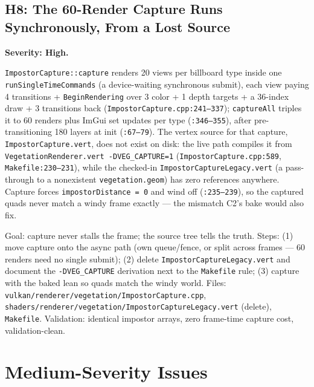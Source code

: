 \documentclass[11pt,a4paper]{article}
\begin{document}
\subsection{H8: The 60-Render Capture Runs Synchronously, From a Lost Source}

\textbf{Severity: High.}

\texttt{ImpostorCapture::capture} renders 20 views per billboard type
inside one \texttt{runSingleTimeCommands} (a device-waiting synchronous
submit), each view paying 4 transitions + \texttt{BeginRendering} over
3 color + 1 depth targets + a 36-index draw + 3 transitions back
(\texttt{ImpostorCapture.cpp:241--337}); \texttt{captureAll} triples it to
60 renders plus ImGui set updates per type (\texttt{:346--355}), after
pre-transitioning 180 layers at init (\texttt{:67--79}). The vertex source
for that capture, \texttt{ImpostorCapture.vert}, does not exist on disk:
the live path compiles it from \texttt{VegetationRenderer.vert
-DVEG\_CAPTURE=1} (\texttt{ImpostorCapture.cpp:589},
\texttt{Makefile:230--231}), while the checked-in
\texttt{ImpostorCaptureLegacy.vert} (a pass-through to a nonexistent
\texttt{vegetation.geom}) has zero references anywhere. Capture forces
\texttt{impostorDistance = 0} and wind off (\texttt{:235--239}), so the
captured quads never match a windy frame exactly --- the mismatch C2's bake
would also fix.

\begin{tcolorbox}[promptbox={Prompt --- H8: async capture, delete the orphan}]
Goal: capture never stalls the frame; the source tree tells the truth.
Steps: (1) move capture onto the async path (own queue/fence, or split
across frames --- 60 renders need no single submit); (2) delete
\texttt{ImpostorCaptureLegacy.vert} and document the \texttt{-DVEG\_CAPTURE}
derivation next to the \texttt{Makefile} rule; (3) capture with the baked
lean so quads match the windy world. Files:
\texttt{vulkan/renderer/vegetation/ImpostorCapture.cpp},
\texttt{shaders/renderer/vegetation/ImpostorCaptureLegacy.vert} (delete),
\texttt{Makefile}. Validation: identical impostor arrays, zero
frame-time capture cost, validation-clean.
\end{tcolorbox}

\section{Medium-Severity Issues}
\end{document}
